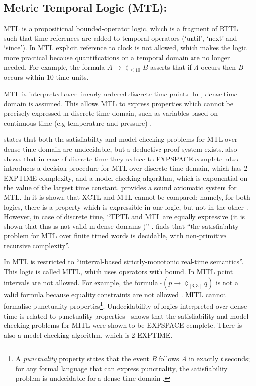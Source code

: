 \documentclass[11pt]{article}
\begin{document}
\subsection{Metric Temporal Logic (MTL): }

MTL \cite{Koy90} is a propositional bounded-operator logic, which is a fragment of RTTL such that time references are added to temporal operators (`until', `next' and `since'). In MTL explicit reference to clock is not allowed, which makes the logic more practical because quantifications on a temporal domain are no longer needed. For example, the formula $A \rightarrow \lozenge_{\leq 10} B$ asserts that if \emph{A} occurs then \emph{B} occurs within 10 time units. 

MTL is interpreted over linearly ordered discrete time points.  In \cite{Koy90}, dense time domain is assumed. This allows MTL to express properties which cannot be precisely expressed in discrete-time domain, such as variables based on continuous time (e.g temperature and pressure) \cite{Ost92}. 

\cite{AH90} states that both the satisfiability and model checking problems for MTL over dense time domain are undecidable, but a deductive proof system exists. \cite{AH90} also shows that in case of discrete time they reduce to 
EXPSPACE-complete. \cite{AH90} also introduces a decision procedure for MTL over discrete time domain, which has 
2-EXPTIME complexity, and a model checking algorithm,  which is exponential on the value of the largest time constant. \cite{Koy90} provides a sound axiomatic system for MTL.  In \cite{HLN90} it is shown that XCTL and MTL cannot be compared; namely, for both logics, there is a property which is expressible in one logic, but not in the other \cite{Ost92}. However, in case of discrete time, ``TPTL and MTL are equally expressive (it is shown that this is not valid in dense domains \cite{Hen91})'' \cite{Ost92}. \cite{OW05} finds that ``the satisfiability problem for MTL over finite timed words is decidable, with non-primitive recursive complexity''.

In \cite{AFH91} MTL is restricted to ``interval-based strictly-monotonic real-time semantics''. This logic is called MITL, which uses operators with bound. In MITL point intervals are not allowed.  For example, the formula $\square (p \rightarrow \lozenge_{[3,3]} q)$ is not a valid formula because equality constraints are not allowed \cite{AHT92}. MITL cannot formalise punctuality properties\footnote{A \emph{punctuality} property states that the event \emph{B} follows \emph{A} in exactly $t$ seconds;  for any formal language that can express punctuality, the satisfiability problem is undecidable for a dense time domain \cite{Ost92}.}. Undecidability of logics interpreted over dense time is related to punctuality properties \cite{AHT92}. \cite{AFH91} shows that the satisfiability and model checking problems for MITL were shown to be EXPSPACE-complete. There is also a model checking algorithm, which is 2-EXPTIME. 
\end{document}
